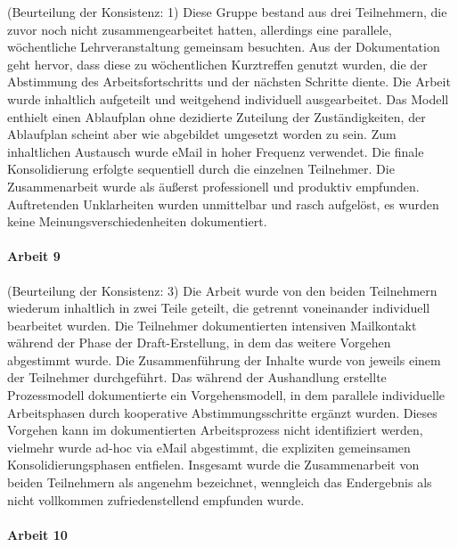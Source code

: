 (Beurteilung der Konsistenz: 1) Diese Gruppe bestand aus drei Teilnehmern, die zuvor noch nicht zusammengearbeitet hatten, allerdings eine parallele, wöchentliche Lehrveranstaltung gemeinsam besuchten. Aus der Dokumentation geht hervor, dass diese zu wöchentlichen Kurztreffen genutzt wurden, die der Abstimmung des Arbeitsfortschritts und der nächsten Schritte diente. Die Arbeit wurde inhaltlich aufgeteilt und weitgehend individuell ausgearbeitet. Das Modell enthielt einen Ablaufplan ohne dezidierte Zuteilung der Zuständigkeiten, der Ablaufplan scheint aber wie abgebildet umgesetzt worden zu sein. Zum inhaltlichen Austausch wurde eMail in hoher Frequenz verwendet. Die finale Konsolidierung erfolgte sequentiell durch die einzelnen Teilnehmer. Die Zusammenarbeit wurde als äußerst professionell und produktiv empfunden. Auftretenden Unklarheiten wurden unmittelbar und rasch aufgelöst, es wurden keine Meinungsverschiedenheiten dokumentiert.


\paragraph{Arbeit 9} %
\label{par:arbeit_9}

(Beurteilung der Konsistenz: 3) Die Arbeit wurde von den beiden Teilnehmern wiederum inhaltlich in zwei Teile geteilt, die getrennt voneinander individuell bearbeitet wurden. Die Teilnehmer dokumentierten intensiven Mailkontakt während der Phase der Draft-Erstellung, in dem das weitere Vorgehen abgestimmt wurde. Die Zusammenführung der Inhalte wurde von jeweils einem der Teilnehmer durchgeführt. Das während der Aushandlung erstellte Prozessmodell dokumentierte ein Vorgehensmodell, in dem parallele individuelle Arbeitsphasen durch kooperative Abstimmungsschritte ergänzt wurden. Dieses Vorgehen kann im dokumentierten Arbeitsprozess nicht identifiziert werden, vielmehr wurde ad-hoc via eMail abgestimmt, die expliziten gemeinsamen Konsolidierungsphasen entfielen. Insgesamt wurde die Zusammenarbeit von beiden Teilnehmern als angenehm bezeichnet, wenngleich das Endergebnis als nicht vollkommen zufriedenstellend empfunden wurde.


\paragraph{Arbeit 10} %
\label{par:arbeit_10}

